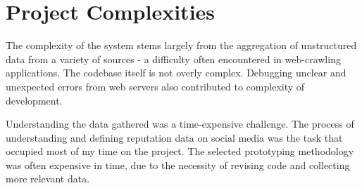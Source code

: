 
\section{Project Complexities}

The complexity of the system stems largely from the aggregation of unstructured data from a variety of sources - a difficulty often encountered in web-crawling applications. The codebase itself is not overly complex. Debugging unclear and unexpected errors from web servers also contributed to complexity of development.


Understanding the data gathered was a time-expensive challenge. The process of understanding and defining reputation data on social media was the task that occupied most of my time on the project. The selected prototyping methodology was often expensive in time, due to the necessity of revising code and collecting more relevant data.





